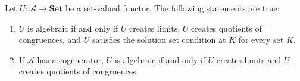 Let $U: \mathcal{A} \longrightarrow \mathbf{Set}$ be a set-valued functor. The following statements are true:

\begin{enumerate}
\item $U$ is algebraic if and only if $U$ creates limits, $U$ creates quotients of congruences, and $U$ satisfies the solution set condition at $K$ for every set $K$.
\item If $\mathcal{A}$ has a cogenerator, $U$ is algebraic if and only if $U$ creates limits and $U$ creates quotients of congruences.
\end{enumerate}
